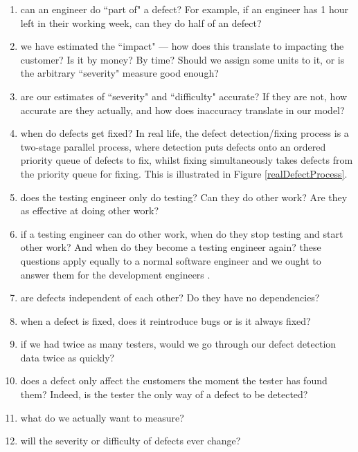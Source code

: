 \begin{enumerate}
	\item can an engineer do ``part of" a defect?
	For example, if an engineer has 1 hour left in their working week, can they do half of an \easy
defect? \label{openQuestOne}
	\item we have estimated the ``impact" --- how does this translate to impacting the customer?
	Is it by money?
	By time?
	Should we assign some units to it, or is the arbitrary ``severity" measure good enough?
	\label{openQuestTwo}
	\item are our estimates of ``severity" and ``difficulty" accurate?
	If they are not, how accurate are they actually, and how does inaccuracy translate in our model?
	\label{openQuestThree}
	\item when do defects get fixed?
	In real life, the defect detection/fixing process is a two-stage parallel process, where detection
puts defects onto an ordered priority queue of defects to fix, whilst fixing simultaneously takes
defects from the priority queue for fixing.
	This is illustrated in Figure \ref{realDefectProcess}. \label{openQuestFour}
	\item does the testing engineer only do testing?
	Can they do other work?
	Are they as effective at doing other work? \label{openQuestFive}
	\item if a testing engineer can do other work, when do they stop testing and start other work?
	And when do they become a testing engineer again? these questions apply equally to a normal software engineer and we ought to answer them for
the development engineers \label{openQuestSix}. 
	\item are defects independent of each other? Do they have no dependencies? \label{openQuestSeven}
	\item when a defect is fixed, does it reintroduce bugs or is it always fixed?
	\label{openQuestEight}
	\item if we had twice as many testers, would we go through our defect detection data twice as
quickly? \label{openQuestNine}
	\item does a defect only affect the customers the moment the tester has found them?
	Indeed, is the tester the only way of a defect to be detected? \label{openQuestTen}
	\item what do we actually want to measure? \label{openQuestEleven}
	\item will the severity or difficulty of defects ever change? \label{openQuestTwelve}
\end{enumerate}

